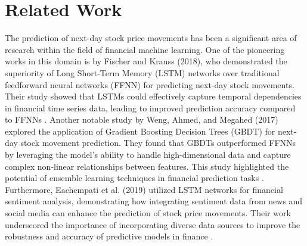 \documentclass{article}
\begin{document}
\medskip

\section{Related Work}

The prediction of next-day stock price movements has been a significant area of research within the field of financial machine learning. One of the pioneering works in this domain is by Fischer and Krauss (2018), who demonstrated the superiority of Long Short-Term Memory (LSTM) networks over traditional feedforward neural networks (FFNN) for predicting next-day stock movements. Their study showed that LSTMs could effectively capture temporal dependencies in financial time series data, leading to improved prediction accuracy compared to FFNNs \cite{fischer2018}. Another notable study by Weng, Ahmed, and Megahed (2017) explored the application of Gradient Boosting Decision Trees (GBDT) for next-day stock movement prediction. They found that GBDTs outperformed FFNNs by leveraging the model's ability to handle high-dimensional data and capture complex non-linear relationships between features. This study highlighted the potential of ensemble learning techniques in financial prediction tasks \cite{weng2017}. Furthermore, Eachempati et al. (2019) utilized LSTM networks for financial sentiment analysis, demonstrating how integrating sentiment data from news and social media can enhance the prediction of stock price movements. Their work underscored the importance of incorporating diverse data sources to improve the robustness and accuracy of predictive models in finance \cite{eachempati}.
\end{document}
